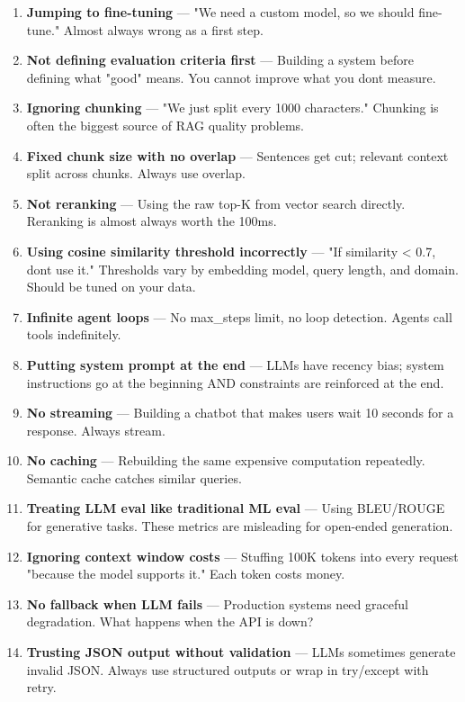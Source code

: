\documentclass[11pt]{article}
\begin{document}
\begin{enumerate}
\def\labelenumi{\arabic{enumi}.}
\item
  \textbf{Jumping to fine-tuning} --- "We need a custom model, so we should fine-tune." Almost always wrong as a first step.
\item
  \textbf{Not defining evaluation criteria first} --- Building a system before defining what "good" means. You cannot improve what you don\textquotesingle t measure.
\item
  \textbf{Ignoring chunking} --- "We just split every 1000 characters." Chunking is often the biggest source of RAG quality problems.
\item
  \textbf{Fixed chunk size with no overlap} --- Sentences get cut; relevant context split across chunks. Always use overlap.
\item
  \textbf{Not reranking} --- Using the raw top-K from vector search directly. Reranking is almost always worth the 100ms.
\item
  \textbf{Using cosine similarity threshold incorrectly} --- "If similarity \textless{} 0.7, don\textquotesingle t use it." Thresholds vary by embedding model, query length, and domain. Should be tuned on your data.
\item
  \textbf{Infinite agent loops} --- No max\_steps limit, no loop detection. Agents call tools indefinitely.
\item
  \textbf{Putting system prompt at the end} --- LLMs have recency bias; system instructions go at the beginning AND constraints are reinforced at the end.
\item
  \textbf{No streaming} --- Building a chatbot that makes users wait 10 seconds for a response. Always stream.
\item
  \textbf{No caching} --- Rebuilding the same expensive computation repeatedly. Semantic cache catches similar queries.
\item
  \textbf{Treating LLM eval like traditional ML eval} --- Using BLEU/ROUGE for generative tasks. These metrics are misleading for open-ended generation.
\item
  \textbf{Ignoring context window costs} --- Stuffing 100K tokens into every request "because the model supports it." Each token costs money.
\item
  \textbf{No fallback when LLM fails} --- Production systems need graceful degradation. What happens when the API is down?
\item
  \textbf{Trusting JSON output without validation} --- LLMs sometimes generate invalid JSON. Always use structured outputs or wrap in try/except with retry.
\end{enumerate}
\end{document}
